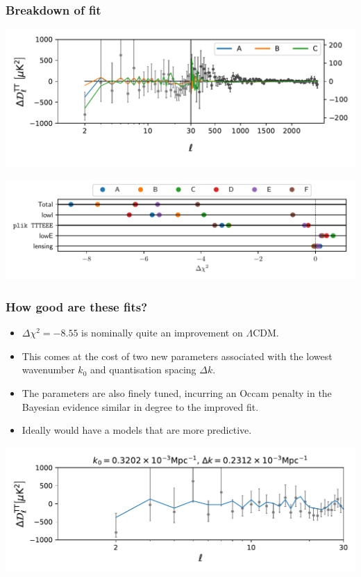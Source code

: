 \documentclass[%
]{beamer}
\begin{document}
\begin{frame}
    \frametitle{Breakdown of fit}
    \includegraphics[width=\textwidth]{TT_linear_dl}

    \includegraphics[width=\textwidth]{chi2_contributions}

\end{frame}

\begin{frame}
    \frametitle{How good are these fits?}
    \begin{itemize}
        \item $\Delta\chi^2=-8.55$ is nominally quite an improvement on $\Lambda$CDM.
        \item This comes at the cost of two new parameters associated with the lowest wavenumber $k_0$ and quantisation spacing $\Delta k$.
        \item The parameters are also finely tuned, incurring an Occam penalty in the Bayesian evidence similar in degree to the improved fit.
        \item Ideally would have a models that are more predictive.
    \end{itemize}
    \includegraphics[width=\textwidth]{best_lowl}
\end{frame}
\end{document}
